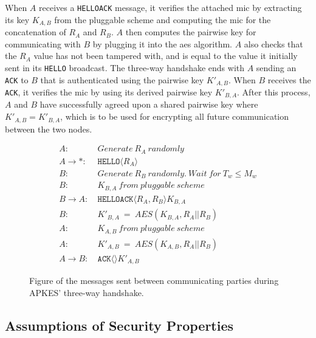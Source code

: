 When $A$ receives a \texttt{HELLOACK} message, it verifies the attached \gls{mic} by extracting its key $K_{A,B}$ from the pluggable scheme and computing the \gls{mic} for the concatenation of $R_A$ and $R_B$. $A$ then computes the pairwise key for communicating with $B$ by plugging it into the \gls{aes} algorithm. $A$ also checks that the $R_A$ value has not been tampered with, and is equal to the value it initially sent in its \texttt{HELLO} broadcast. The three-way handshake ends with $A$ sending an \texttt{ACK} to $B$ that is authenticated using the pairwise key $K'_{A,B}$. When $B$ receives the \texttt{ACK}, it verifies the \gls{mic} by using its derived pairwise key $K'_{B,A}$. After this process, $A$ and $B$ have successfully agreed upon a shared pairwise key where $K'_{A,B} = K'_{B,A}$, which is to be used for encrypting all future communication between the two nodes.




\begin{figure}[h]
\begin{tcolorbox}[title=Three-way handshake in APKES]
\begin{align*}
A:\ & Generate\ R_A\ randomly\\
A \rightarrow *:\ & \texttt{HELLO}\langle{R_A}\rangle{}\\
B:\ & Generate\ R_B\ randomly.\ Wait\ for\ T_w \leq M_w\\
B:\ & K_{B,A}\ from\ pluggable\ scheme\\
B \rightarrow A:\ & \texttt{HELLOACK}\langle{R_A, R_B}\rangle{K_{B,A}}\\
B:\ & K'_{B,A}\ =\ AES(K_{B,A}, R_A || R_B)\\
A:\ & K_{A,B}\ from\ pluggable\ scheme\\
A:\ & K'_{A,B}\ =\ AES(K_{A,B}, R_A || R_B)\\
A \rightarrow B:\ & \texttt{ACK}\langle{}\rangle{K'_{A,B}}
\end{align*}
\end{tcolorbox}
\caption{Figure of the messages sent between communicating parties during APKES' three-way handshake.}
\label{fig:apkes-handshake}
\end{figure}

\subsection{Assumptions of Security Properties}
\label{subsec:apkes-prop}

